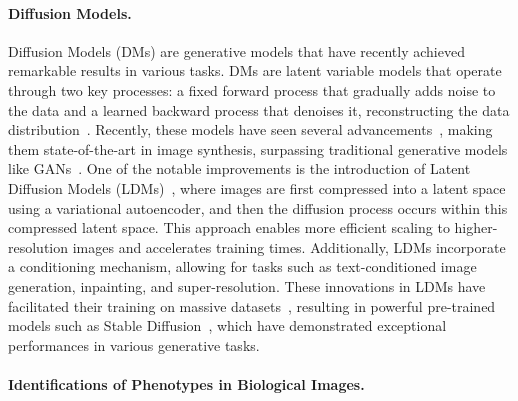 \label{gen_inst}

\paragraph{Diffusion Models.} Diffusion Models (DMs)\cite{ddpm,ddim} are generative models that have recently achieved remarkable results in various tasks. DMs are latent variable models that operate through two key processes: a fixed forward process that gradually adds noise to the data and a learned backward process that denoises it, reconstructing the data distribution~\cite{ddpm,ddim}. Recently, these models have seen several advancements~\cite{ddim,diffusion_beat_gans,classifier_free,unified_diffusion}, making them state-of-the-art in image synthesis, surpassing traditional generative models like GANs~\cite{diffusion_beat_gans}. One of the notable improvements is the introduction of Latent Diffusion Models (LDMs)~\cite{stable_diffusion}, where images are first compressed into a latent space using a variational autoencoder, and then the diffusion process occurs within this compressed latent space. This approach enables more efficient scaling to higher-resolution images and accelerates training times. Additionally, LDMs incorporate a conditioning mechanism, allowing for tasks such as text-conditioned image generation, inpainting, and super-resolution.
These innovations in LDMs have facilitated their training on massive datasets~\cite{LAION_dataset}, resulting in powerful pre-trained models such as Stable Diffusion~\cite{stable_diffusion}, which have demonstrated exceptional performances in various generative tasks.

\paragraph{Identifications of Phenotypes in Biological Images.}


